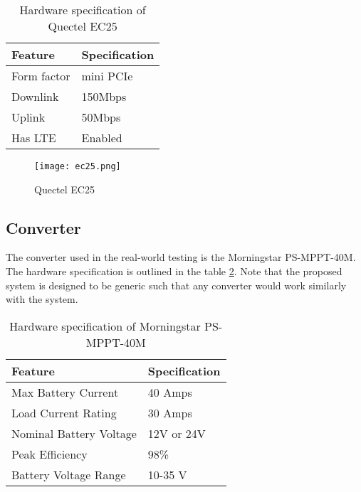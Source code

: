 \documentclass[../thesis.tex]{subfiles}
\begin{document}
\begin{table}[h!]
	\begin{center}
		\caption{Hardware specification of Quectel EC25}
		\label{tab:quectelEC25}
		\begin{tabular}{l|l}
			\toprule
			\textbf{Feature} & \textbf{Specification}\\
			\midrule
			Form factor & mini PCIe\\
			Downlink & 150Mbps\\
			Uplink & 50Mbps\\
			Has LTE & Enabled\\ 
			\bottomrule
		\end{tabular}
	\end{center}
\end{table}

\begin{figure}[!ht]
	\centering
	\texttt{[image: ec25.png]}
	\caption{Quectel EC25 \cite{Quectel}}
	\label{fig:quectelEC25}
\end{figure}

\subsection{Converter}

The converter used in the real-world testing is the Morningstar PS-MPPT-40M. The hardware specification is outlined in the table \ref{tab:psmppt40m}. Note that the proposed system is designed to be generic such that any converter would work similarly with the system. 

\begin{table}[h!]
	\begin{center}
		\caption{Hardware specification of Morningstar PS-MPPT-40M}
		\label{tab:psmppt40m}
		\begin{tabular}{l|l}
			\toprule
			\textbf{Feature} & \textbf{Specification}\\
			\midrule
			Max Battery Current & 40 Amps\\
			Load Current Rating & 30 Amps\\
			Nominal Battery Voltage & 12V or 24V\\
			Peak Efficiency & 98\%\\ 
			Battery Voltage Range & 10-35 V\\ 
			\bottomrule
		\end{tabular}
	\end{center}
\end{table}
\end{document}
